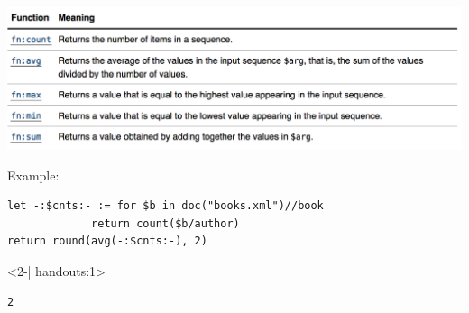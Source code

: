\begin{frame}[fragile]
\includegraphics[width=\textwidth]{figures/XQuery_sequence_functions3.png}

Example:

\begin{lstlisting}[style=XQuery]
let -:$cnts:- := for $b in doc("books.xml")//book
             return count($b/author)
return round(avg(-:$cnts:-), 2)
\end{lstlisting}

\begin{onlyenv}<2-| handouts:1>
\begin{lstlisting}[style=markup]
2
\end{lstlisting}
\end{onlyenv}
\end{frame}

